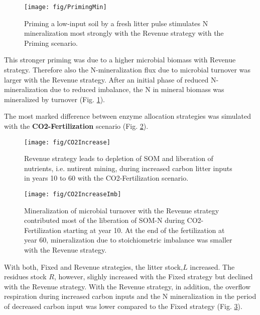 \begin{figure}[t]
\vspace*{2mm}
\begin{center}
\texttt{[image: fig/PrimingMin]}
\end{center}
\caption{Priming a low-input soil by a fresh litter pulse stimulates N
mineralization most strongly with the Revenue strategy with the Priming scenario.
\label{fig:PrimingMin}}
\end{figure}

This stronger priming was due to a higher microbial biomass with Revenue
strategy. Therefore also the N-mineralization flux due to microbial turnover
was larger with the Revenue strategy. After an initial phase of reduced
N-mineralization due to reduced imbalance, the N in mineral biomass was
mineralized by turnover (Fig. \ref{fig:PrimingMin}).

The most marked difference between enzyme allocation strategies was simulated
with the \textbf{CO2-Fertilization} scenario (Fig. \ref{fig:CO2Increase}).
\begin{figure}[t] \vspace*{2mm}
\begin{center}
\texttt{[image: fig/CO2Increase]}
\end{center}
\caption{
Revenue strategy leads to depletion of SOM and liberation of nutrients, i.e.
nutirent mining, during increased carbon litter inputs
in years 10 to 60 with the CO2-Fertilization scenario.
\label{fig:CO2Increase}}

\end{figure}
\begin{figure}[t] \vspace*{2mm}
\begin{center}
\texttt{[image: fig/CO2IncreaseImb]} 
\end{center}
\caption{
Mineralization of microbial turnover with the Revenue strategy
contributed most of the liberation of SOM-N during CO2-Fertilization starting
at year 10.
At the end of the fertilization at year 60, mineralization due to stoichiometric
imbalance was smaller with the Revenue strategy.
\label{fig:CO2IncreaseImb}}
\end{figure}
With both, Fixed and Revenue strategies, the litter stock,$L$ increased. The
residues stock $R$, however, slighly increased with the Fixed strategy but
declined with the Revenue strategy. With the Revenue strategy, in addition, the
overflow respiration during increased carbon inputs and the N mineralization
in the period of decreased carbon input was lower compared to the Fixed
strategy (Fig. \ref{fig:CO2IncreaseImb}).

